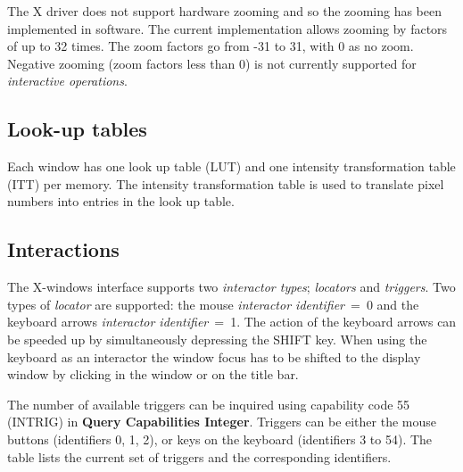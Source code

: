 \documentclass[11pt,nolof]{starlink}
\begin{document}
The X driver does not support hardware zooming and so the zooming has
been implemented in software. The current implementation allows zooming
by factors of up to 32 times. The zoom factors go from -31 to 31, with
0 as no zoom. Negative zooming (zoom factors less than 0) is not
currently supported for \textit{interactive operations}.

\subsection{Look-up tables}

Each window has one look up table (LUT) and one intensity transformation
table (ITT) per memory. The intensity transformation table is used to
translate pixel numbers into entries in the look up table.

\subsection{Interactions\label{interactions-cross-ref}}

The X-windows interface supports two \textit{interactor types}; \textit{locators}
and \textit{triggers}. Two types of \textit{locator} are supported: the mouse
\textit{interactor identifier}~=~0 and the keyboard arrows
\textit{interactor identifier}~=~1. The action of the keyboard arrows can be
speeded up by simultaneously depressing the SHIFT key. When using the keyboard
as an interactor the window focus has to be shifted to the display window
by clicking in the window or on the title bar.

The number of available triggers can be inquired using capability code
55 (INTRIG) in \textbf{Query Capabilities Integer}.
Triggers can be either the mouse buttons (identifiers 0, 1, 2), or keys on
the keyboard (identifiers 3 to 54). The table lists the current set
of triggers and the corresponding identifiers.
\end{document}
